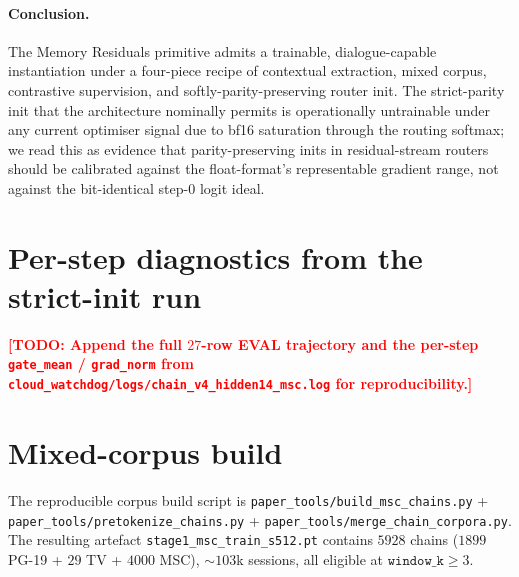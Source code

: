 \documentclass{article}
\newcommand{\todo}[1]{\textcolor{red}{\textbf{[TODO: #1]}}}
\begin{document}
\paragraph{Conclusion.} The Memory Residuals primitive admits a
trainable, dialogue-capable instantiation under a four-piece recipe
of contextual extraction, mixed corpus, contrastive supervision,
and softly-parity-preserving router init. The strict-parity init
that the architecture nominally permits is operationally untrainable
under any current optimiser signal due to bf16 saturation through
the routing softmax; we read this as evidence that
parity-preserving inits in residual-stream routers should be
calibrated against the float-format's representable gradient range,
not against the bit-identical step-$0$ logit ideal.




\appendix

\section{Per-step diagnostics from the strict-init run}
\label{app:strict_logs}

\todo{Append the full $27$-row EVAL trajectory and the per-step
\texttt{gate\_mean} / \texttt{grad\_norm} from
\texttt{cloud\_watchdog/logs/chain\_v4\_hidden14\_msc.log} for
reproducibility.}

\section{Mixed-corpus build}
\label{app:corpus}

The reproducible corpus build script is
\texttt{paper\_tools/build\_msc\_chains.py} +
\texttt{paper\_tools/pretokenize\_chains.py} +
\texttt{paper\_tools/merge\_chain\_corpora.py}. The resulting artefact
\texttt{stage1\_msc\_train\_s512.pt} contains $5928$ chains
($1899$ PG-19 + $29$ TV + $4000$ MSC), $\sim 103$k sessions, all
eligible at $\texttt{window\_k}{\ge}3$.
\end{document}
